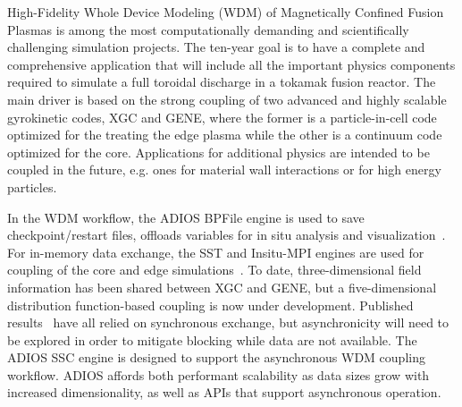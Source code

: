 
High-Fidelity Whole Device Modeling (WDM) of Magnetically Confined Fusion Plasmas is among the most computationally demanding and scientifically challenging simulation projects.
The ten-year goal is to have a complete and comprehensive application 
that will include all the important physics components required to 
simulate a full toroidal discharge in a tokamak fusion reactor. 
The main driver is based on the strong coupling of two advanced and 
highly scalable gyrokinetic codes, XGC and GENE, where the former is a 
particle-in-cell code optimized for the treating the edge plasma while 
the other is a continuum code optimized for the core.
Applications for additional physics are intended 
to be coupled in the future, e.g. ones for material wall interactions or
for high energy particles.

In the WDM workflow, the ADIOS BPFile engine is used to save checkpoint/restart files, 
offloads variables for in situ analysis and
visualization~\cite{escience2018}. 
For in-memory data exchange, the SST and Insitu-MPI engines are used for coupling of the core and edge simulations~\cite{dominski2018}.
To date, three-dimensional field information has been
shared between XGC and GENE, but a five-dimensional distribution 
function-based coupling is now under development. Published results~\cite{escience2018, dominski2018}
have all relied on synchronous exchange, but asynchronicity will need to
be explored in order to mitigate blocking while data are not available. The ADIOS SSC engine is designed to support the asynchronous WDM coupling workflow. 
ADIOS affords both performant scalability as data sizes grow with 
increased dimensionality, as well as APIs that support asynchronous
operation.

